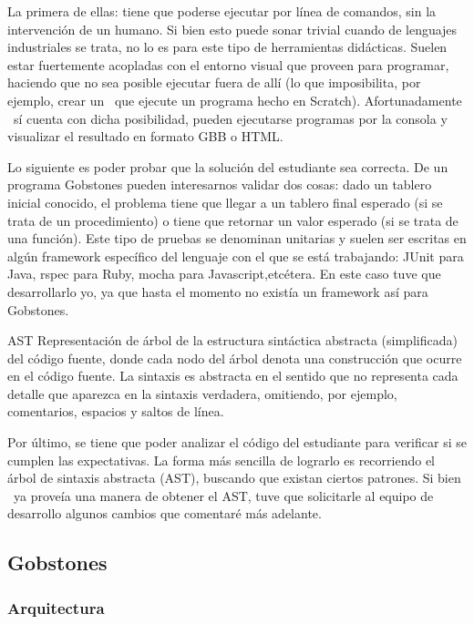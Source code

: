 La primera de ellas: tiene que poderse ejecutar por línea de comandos, sin la intervención de un humano. Si bien esto puede sonar trivial cuando de lenguajes industriales se trata, no lo es para este tipo de herramientas didácticas. Suelen estar fuertemente acopladas con el entorno visual que proveen para programar, haciendo que no sea posible ejecutar fuera de allí (lo que imposibilita, por ejemplo, crear un \runner\ que ejecute un programa hecho en Scratch). Afortunadamente \pyGob\ sí cuenta con dicha posibilidad, pueden ejecutarse programas por la consola y visualizar el resultado en formato GBB o HTML.

Lo siguiente es poder probar que la solución del estudiante sea correcta. De un programa Gobstones pueden interesarnos validar dos cosas: dado un tablero inicial conocido, el problema tiene que llegar a un tablero final esperado (si se trata de un procedimiento) o tiene que retornar un valor esperado (si se trata de una función). Este tipo de pruebas se denominan unitarias y suelen ser escritas en algún framework específico del lenguaje con el que se está trabajando: JUnit para Java, rspec para Ruby, mocha para Javascript,etcétera. En este caso tuve que desarrollarlo yo, ya que hasta el momento no existía un framework así para Gobstones.

\sepfootnotecontent
  {AST}
  {Representación de árbol de la estructura sintáctica abstracta (simplificada) del código fuente, donde cada nodo del árbol denota una construcción que ocurre en el código fuente. La sintaxis es abstracta en el sentido que no representa cada detalle que aparezca en la sintaxis verdadera, omitiendo, por ejemplo, comentarios, espacios y saltos de línea.}

Por último, se tiene que poder analizar el código del estudiante para verificar si se cumplen las expectativas. La forma más sencilla de lograrlo es recorriendo el árbol de sintaxis abstracta (AST), buscando que existan ciertos patrones. Si bien \pyGob\ ya proveía una manera de obtener el AST, tuve que solicitarle al equipo de desarrollo algunos cambios que comentaré más adelante.

\subsection{Gobstones}

\subsubsection{Arquitectura}

